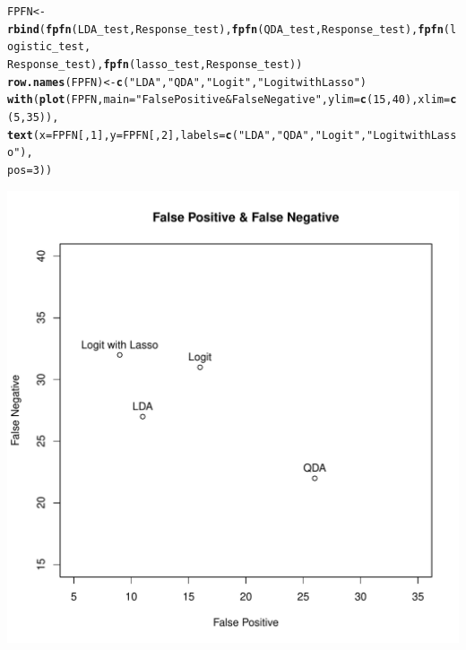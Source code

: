 \documentclass{article}\usepackage[]{graphicx}\usepackage[]{color}
\makeatletter
\def\maxwidth{ %
  \ifdim\Gin@nat@width>\linewidth
    \linewidth
  \else
    \Gin@nat@width
  \fi
}
\newcommand{\hlnum}[1]{\textcolor[rgb]{0.686,0.059,0.569}{#1}}%
\newcommand{\hlstr}[1]{\textcolor[rgb]{0.192,0.494,0.8}{#1}}%
\newcommand{\hlstd}[1]{\textcolor[rgb]{0.345,0.345,0.345}{#1}}%
\newcommand{\hlkwb}[1]{\textcolor[rgb]{0.69,0.353,0.396}{#1}}%
\newcommand{\hlkwc}[1]{\textcolor[rgb]{0.333,0.667,0.333}{#1}}%
\newcommand{\hlkwd}[1]{\textcolor[rgb]{0.737,0.353,0.396}{\textbf{#1}}}%
\newenvironment{kframe}{%
 \def\at@end@of@kframe{}%
 \ifinner\ifhmode%
  \def\at@end@of@kframe{\end{minipage}}%
  \begin{minipage}{\columnwidth}%
 \fi\fi%
 \def\FrameCommand##1{\hskip\@totalleftmargin \hskip-\fboxsep
 \colorbox{shadecolor}{##1}\hskip-\fboxsep
     \hskip-\linewidth \hskip-\@totalleftmargin \hskip\columnwidth}%
 \MakeFramed {\advance\hsize-\width
   \@totalleftmargin\z@ \linewidth\hsize
   \@setminipage}}%
 {\par\unskip\endMakeFramed%
 \at@end@of@kframe}
\newenvironment{knitrout}{}{} %
\makeatother
\begin{document}
\begin{knitrout}
\begin{kframe}\begin{alltt}
\hlstd{FPFN} \hlkwb{<-} \hlkwd{rbind}\hlstd{(}\hlkwd{fpfn}\hlstd{(LDA_test, Response_test),} \hlkwd{fpfn}\hlstd{(QDA_test, Response_test),} \hlkwd{fpfn}\hlstd{(logistic_test,}
    \hlstd{Response_test),} \hlkwd{fpfn}\hlstd{(lasso_test, Response_test))}
\hlkwd{row.names}\hlstd{(FPFN)} \hlkwb{<-} \hlkwd{c}\hlstd{(}\hlstr{"LDA"}\hlstd{,} \hlstr{"QDA"}\hlstd{,} \hlstr{"Logit"}\hlstd{,} \hlstr{"Logit with Lasso"}\hlstd{)}
\hlkwd{with}\hlstd{(}\hlkwd{plot}\hlstd{(FPFN,} \hlkwc{main} \hlstd{=} \hlstr{"False Positive & False Negative"}\hlstd{,} \hlkwc{ylim} \hlstd{=} \hlkwd{c}\hlstd{(}\hlnum{15}\hlstd{,} \hlnum{40}\hlstd{),} \hlkwc{xlim} \hlstd{=} \hlkwd{c}\hlstd{(}\hlnum{5}\hlstd{,} \hlnum{35}\hlstd{)),}
    \hlkwd{text}\hlstd{(}\hlkwc{x} \hlstd{= FPFN[,} \hlnum{1}\hlstd{],} \hlkwc{y} \hlstd{= FPFN[,} \hlnum{2}\hlstd{],} \hlkwc{labels} \hlstd{=} \hlkwd{c}\hlstd{(}\hlstr{"LDA"}\hlstd{,} \hlstr{"QDA"}\hlstd{,} \hlstr{"Logit"}\hlstd{,} \hlstr{"Logit with Lasso"}\hlstd{),}
        \hlkwc{pos} \hlstd{=} \hlnum{3}\hlstd{))}
\end{alltt}
\end{kframe}
\includegraphics[width=\maxwidth]{figure/minimal-SouthAfrica3} 

\end{knitrout}
\end{document}
